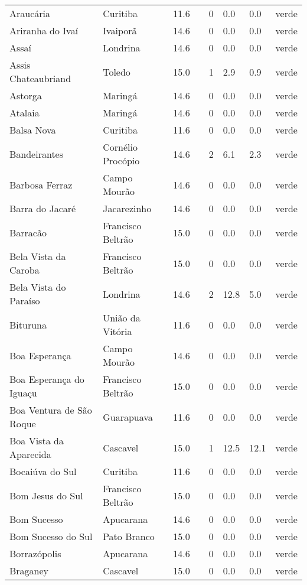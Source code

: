 \begin{longtable}{l|lllllll}
  Araucária & Curitiba & 11.6 &  & 0 & 0.0 & 0.0 & verde \\ 
  Ariranha do Ivaí & Ivaiporã & 14.6 &  & 0 & 0.0 & 0.0 & verde \\ 
  Assaí & Londrina & 14.6 &  & 0 & 0.0 & 0.0 & verde \\ 
  Assis Chateaubriand & Toledo & 15.0 &  & 1 & 2.9 & 0.9 & verde \\ 
  Astorga & Maringá & 14.6 &  & 0 & 0.0 & 0.0 & verde \\ 
  Atalaia & Maringá & 14.6 &  & 0 & 0.0 & 0.0 & verde \\ 
  Balsa Nova & Curitiba & 11.6 &  & 0 & 0.0 & 0.0 & verde \\ 
  Bandeirantes & Cornélio Procópio & 14.6 &  & 2 & 6.1 & 2.3 & verde \\ 
  Barbosa Ferraz & Campo Mourão & 14.6 &  & 0 & 0.0 & 0.0 & verde \\ 
  Barra do Jacaré & Jacarezinho & 14.6 &  & 0 & 0.0 & 0.0 & verde \\ 
  Barracão & Francisco Beltrão & 15.0 &  & 0 & 0.0 & 0.0 & verde \\ 
  Bela Vista da Caroba & Francisco Beltrão & 15.0 &  & 0 & 0.0 & 0.0 & verde \\ 
  Bela Vista do Paraíso & Londrina & 14.6 &  & 2 & 12.8 & 5.0 & verde \\ 
  Bituruna & União da Vitória & 11.6 &  & 0 & 0.0 & 0.0 & verde \\ 
  Boa Esperança & Campo Mourão & 14.6 &  & 0 & 0.0 & 0.0 & verde \\ 
  Boa Esperança do Iguaçu & Francisco Beltrão & 15.0 &  & 0 & 0.0 & 0.0 & verde \\ 
  Boa Ventura de São Roque & Guarapuava & 11.6 &  & 0 & 0.0 & 0.0 & verde \\ 
  Boa Vista da Aparecida & Cascavel & 15.0 &  & 1 & 12.5 & 12.1 & verde \\ 
  Bocaiúva do Sul & Curitiba & 11.6 &  & 0 & 0.0 & 0.0 & verde \\ 
  Bom Jesus do Sul & Francisco Beltrão & 15.0 &  & 0 & 0.0 & 0.0 & verde \\ 
  Bom Sucesso & Apucarana & 14.6 &  & 0 & 0.0 & 0.0 & verde \\ 
  Bom Sucesso do Sul & Pato Branco & 15.0 &  & 0 & 0.0 & 0.0 & verde \\ 
  Borrazópolis & Apucarana & 14.6 &  & 0 & 0.0 & 0.0 & verde \\ 
  Braganey & Cascavel & 15.0 &  & 0 & 0.0 & 0.0 & verde \\ 

\end{longtable}
